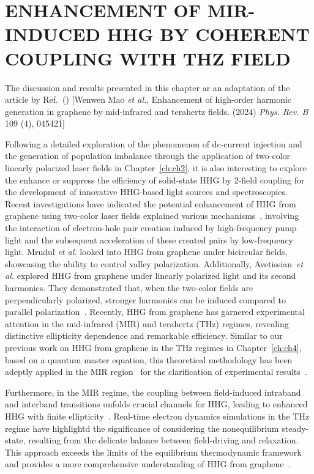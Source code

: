 \chapter{ENHANCEMENT OF MIR-INDUCED HHG BY COHERENT COUPLING WITH THZ FIELD \label{ch:ch5}}
The discussion and results presented in this chapter ar an adaptation of the article by Ref.~(\cite{mao2024enhancement}) [Wenwen Mao \emph{et al.}, Enhancement of high-order harmonic generation in graphene by mid-infrared and terahertz fields. (2024) {\it Phys. Rev. B} 109 (4), 045421]

Following a detailed exploration of the phenomenon of dc-current injection and the generation of population imbalance through the application of two-color linearly polarized laser fields in Chapter~\ref{ch:ch2}, it is also interesting to explore the enhance or suppress the efficiency of solid-state \gls{HHG} by 2-field coupling for the development of innovative HHG-based light sources and spectroscopies. Recent investigations have indicated the potential enhancement of HHG from graphene using two-color laser fields explained various mechanisms~\cite{PhysRevB.100.035434,Mrudul:21,PhysRevB.105.195405}, involving the interaction of electron-hole pair creation induced by high-frequency pump light and the subsequent acceleration of these created pairs by low-frequency light. Mrudul \textit{et al.} looked into HHG from graphene under bicircular fields, showcasing the ability to control valley polarization\cite{Mrudul:21}. Additionally, Avetissian~\textit{et al.} explored HHG from graphene under linearly polarized light and its second harmonics. They demonstrated that, when the two-color fields are perpendicularly polarized, stronger harmonics can be induced compared to parallel polarization~\cite{PhysRevB.105.195405}.
Recently, \gls{HHG} from graphene has garnered experimental attention in the mid-infrared (MIR)\cite{doi:10.1126/science.aam8861,cha2022gate} and terahertz (THz)\cite{Hafez2018,doi:10.1126/sciadv.abf9809} regimes, revealing distinctive ellipticity dependence and remarkable efficiency. Similar to our previous work on HHG from graphene in the THz regimes in Chapter~\ref{ch:ch4}, based on a quantum master equation, this theoretical methodology has been adeptly applied in the MIR region~\cite{PhysRevB.103.L041408} for the clarification of experimental results~\cite{doi:10.1126/science.aam8861,cha2022gate}.

Furthermore, in the MIR regime, the coupling between field-induced intraband and interband transitions unfolds crucial channels for HHG, leading to enhanced HHG with finite ellipticity~\cite{PhysRevB.103.L041408}. Real-time electron dynamics simulations in the THz regime have highlightd the significance of considering the nonequilibrium steady-state, resulting from the delicate balance between field-driving and relaxation. This approach exceeds the limits of the equilibrium thermodynamic framework and provides a more comprehensive understanding of HHG from graphene~\cite{PhysRevB.106.024313}.


